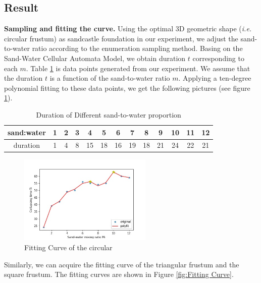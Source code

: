 \documentclass{mcmthesis}		    %
\def\ie{\mbox{\textit{i.e.}}}
\begin{document}
    
    \subsection{Result}
    \textbf{Sampling and fitting the curve.} Using the optimal 3D geometric shape (\ie~ circular frustum) as sandcastle foundation in our experiment, we adjust the sand-to-water ratio according to the enumeration sampling method. Basing on the Sand-Water Cellular Automata Model, we obtain duration $t$ corresponding to each $m$. Table \ref{tab:Duration of Different Water-sand proportion} is data points generated from our experiment. We assume that the duration $t$ is a function of the sand-to-water ratio $m$. Applying a ten-degree polynomial fitting to these data points, we get the following pictures (see figure~ \ref{fig:Fitting Curve of the circular frustum}).
    \begin{table}[htbp!]
    \centering
	\caption{Duration of Different sand-to-water proportion}
	\label{tab:Duration of Different Water-sand proportion}
    \begin{tabular}{|c|c|c|c|c|c|c|c|c|c|c|c|c|}
    \hline
    sand:water & 1  & 2  & 3  & 4  & 5  & 6  & 7  & 8  & 9  & 10 & 11 & 12 \\ \hline
    duration   & 1 & 4 & 8 & 15 & 18 & 16 & 19 & 18 & 21 & 24 & 22 & 21 \\ \hline
   \end{tabular}
   \end{table}

   \begin{figure}[htbp!]
		\centering
		\includegraphics[width=2.5in]{Fitting Curve.jpg}
		\caption{Fitting Curve of the circular  }
		\label{fig:Fitting Curve of the circular frustum}
	\end{figure}

   Similarly, we can acquire the fitting curve of the triangular frustum and the square frustum. The fitting curves are shown in Figure \ref{fig:Fitting Curve}.
   
\end{document}
